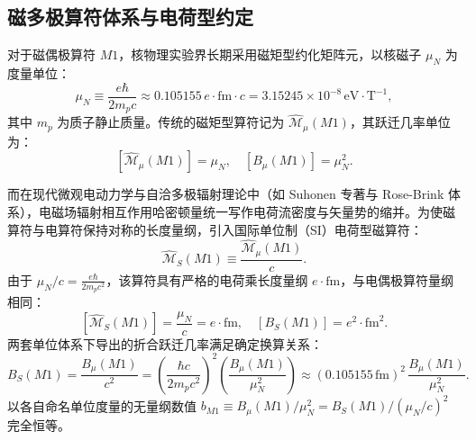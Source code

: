 \subsection{磁多极算符体系与电荷型约定}
对于磁偶极算符 $M1$，核物理实验界长期采用磁矩型约化矩阵元，以核磁子 $\mu_N$ 为度量单位：
\begin{equation}\label{eq:appA-mun-def}
\mu_N \equiv \frac{e \hbar}{2 m_p c} \approx 0.105155 \, e \cdot \mathrm{fm} \cdot c = 3.15245 \times 10^{-8} \, \mathrm{eV} \cdot \mathrm{T}^{-1} ,
\end{equation}
其中 $m_p$ 为质子静止质量。传统的磁矩型算符记为 $\hat{\mathcal{M}}_\mu(M1)$，其跃迁几率单位为：
\begin{equation}\label{eq:appA-m1-mu-unit}
[\hat{\mathcal{M}}_\mu(M1)] = \mu_N , \quad [B_\mu(M1)] = \mu_N^2 .
\end{equation}

而在现代微观电动力学与自洽多极辐射理论中（如 Suhonen 专著与 Rose-Brink 体系），电磁场辐射相互作用哈密顿量统一写作电荷流密度与矢量势的缩并。为使磁算符与电算符保持对称的长度量纲，引入国际单位制（SI）电荷型磁算符：
\begin{equation}\label{eq:appA-ms-def}
\hat{\mathcal{M}}_S(M1) \equiv \frac{\hat{\mathcal{M}}_\mu(M1)}{c} .
\end{equation}
由于 $\mu_N / c = \frac{e\hbar}{2m_p c^2}$，该算符具有严格的电荷乘长度量纲 $e\cdot\mathrm{fm}$，与电偶极算符量纲相同：
\begin{equation}\label{eq:appA-ms-dimension}
[\hat{\mathcal{M}}_S(M1)] = \frac{\mu_N}{c} = e \cdot \mathrm{fm} , \quad [B_S(M1)] = e^2 \cdot \mathrm{fm}^2 .
\end{equation}
两套单位体系下导出的折合跃迁几率满足确定换算关系：
\begin{equation}\label{eq:appA-bs-bmu-trans}
B_S(M1) = \frac{B_\mu(M1)}{c^2} = \left( \frac{\hbar c}{2 m_p c^2} \right)^2 \left( \frac{B_\mu(M1)}{\mu_N^2} \right) \approx (0.105155\,\mathrm{fm})^2 \, \frac{B_\mu(M1)}{\mu_N^2} .
\end{equation}
以各自命名单位度量的无量纲数值 $b_{M1} \equiv B_\mu(M1)/\mu_N^2 = B_S(M1)/(\mu_N/c)^2$ 完全恒等。

